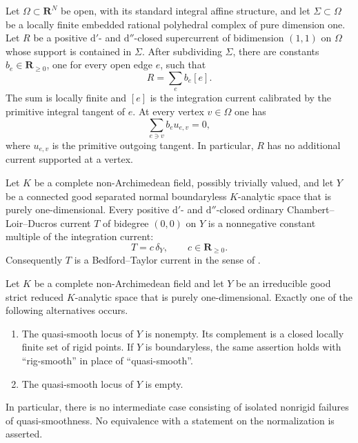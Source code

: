 \begin{lemma}
\label{lem:p213-euclidean-one-dimensional-current-revised}
Let $\Omega\subset\mathbf R^N$ be open, with its standard integral affine
structure, and let $\Sigma\subset\Omega$ be a locally finite embedded
rational polyhedral complex of pure dimension one.  Let $R$ be a positive
$\mathrm d'$- and $\mathrm d''$-closed supercurrent of bidimension $(1,1)$
on $\Omega$ whose support is contained in $\Sigma$.  After subdividing
$\Sigma$, there are constants $b_e\in\mathbf R_{\geq0}$, one for every
open edge $e$, such that
\begin{equation}
                         R=\sum_e b_e[e].
\label{eq:p213-euclidean-edge-decomposition-revised}
\end{equation}
The sum is locally finite and $[e]$ is the integration current calibrated
by the primitive integral tangent of $e$.  At every vertex $v\in\Omega$
one has
\begin{equation}
                    \sum_{e\ni v}b_eu_{e,v}=0,
\label{eq:p213-euclidean-vertex-balance-revised}
\end{equation}
where $u_{e,v}$ is the primitive outgoing tangent.  In particular, $R$
has no additional current supported at a vertex.
\end{lemma}

\begin{proposition}
\label{prop:p213-normal-curve-arbitrary-valuation-current-revised}
Let $K$ be a complete non-Archimedean field, possibly trivially valued,
and let $Y$ be a connected good separated normal boundaryless
$K$-analytic space that is purely one-dimensional.  Every positive
$\mathrm d'$- and $\mathrm d''$-closed ordinary Chambert--Loir--Ducros
current $T$ of bidegree $(0,0)$ on $Y$ is a nonnegative constant multiple
of the integration current:
\begin{equation}
                         T=c\,\delta_Y,
             \qquad c\in\mathbf R_{\geq0}.
\label{eq:p213-normal-curve-arbitrary-classification-revised}
\end{equation}
Consequently $T$ is a Bedford--Taylor current in the sense of
\cite[Definition~8.6.2]{CLD25}.
\end{proposition}

\begin{proposition}
\label{prop:p213-curve-nonsmooth-locus-dichotomy-revised}
Let $K$ be a complete non-Archimedean field and let $Y$ be an irreducible
good strict reduced $K$-analytic space that is purely one-dimensional.
Exactly one of the following alternatives occurs.
\begin{enumerate}
\item The quasi-smooth locus of $Y$ is nonempty.  Its complement is a
closed locally finite set of rigid points.  If $Y$ is boundaryless, the
same assertion holds with ``rig-smooth'' in place of ``quasi-smooth''.
\item The quasi-smooth locus of $Y$ is empty.
\end{enumerate}
In particular, there is no intermediate case consisting of isolated
nonrigid failures of quasi-smoothness.  No equivalence with a statement
on the normalization is asserted.
\end{proposition}

